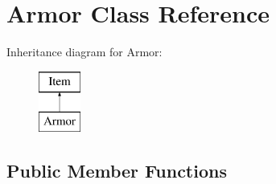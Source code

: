 \hypertarget{class_armor}{}\section{Armor Class Reference}
\label{class_armor}
Inheritance diagram for Armor\+:\begin{figure}[H]
\begin{center}
\leavevmode
\includegraphics[height=2.000000cm]{class_armor}
\end{center}
\end{figure}
\subsection*{Public Member Functions}
